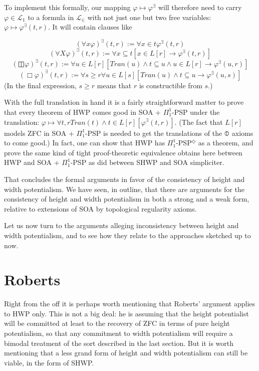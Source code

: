 \documentclass{article}
\begin{document}
To implement this formally, 
our mapping $\varphi \mapsto \varphi^\exists$ will therefore 
need to carry $\varphi \in \mathcal{L}_1$ to a formula in $\mathcal{L}_\in$ with 
not just one but two free variables: $\varphi \mapsto \varphi^\exists(t, r)$. It will 
contain clauses like 

\[ (\forall x \varphi)^\exists(t, r) := \forall x \in t \varphi^\exists(t, r) \]
\[ (\forall X \varphi)^\exists(t, r) := \forall x \subseteq t [x \in L[r] \rightarrow \varphi^\exists(t, r)] \]
\[ (\boxbar \varphi)^\exists(t, r) := \forall u \in L[r] [Tran(u) \wedge t \subseteq u \wedge u \in L[r] \rightarrow \varphi^\exists(u, r)]\]
\[ (\Box \varphi)^\exists(t, r) := \forall s \geq r \forall u \in L[s] [Tran(u) \wedge t \subseteq u  \rightarrow \varphi^\exists(u, s)]\]
(In the final expression, $s \geq r$ means that $r$ is constructible from $s$.)

With the full translation in hand 
it is a fairly straightforward matter to prove that every theorem of HWP 
comes good in SOA + $\Pi_1^1$-PSP under the translation: 
$\varphi \mapsto \forall t, r Tran(t) \wedge t \in L[r][ \varphi^\exists(t, r)]$.
(The fact that $L[r]$ models ZFC
in SOA + $\Pi_1^1$-PSP is needed to get the translations of the $\circledbar$ 
axioms to come good.)
In fact, one can show that HWP has $\Pi_1^1$-PSP$^\Diamond$ as a theorem, and 
prove the same kind of tight proof-theoretic equivalence obtains here 
between HWP and SOA + $\Pi_1^1$-PSP as did between SHWP and SOA simpliciter. 

That concludes the formal arguments 
in favor of the consistency of height and width potentialism.
We have seen, in outline, that there are arguments for the consistency of 
height and width potentialism in both a strong and a weak form, relative to 
extensions of SOA by topological regularity axioms.

Let us 
now turn to the arguments alleging inconsistency between height and width 
potentialism, and to see how they relate to the approaches sketched up to now.

\section{Roberts}

Right from the off it is perhaps worth mentioning 
that Roberts' argument applies to HWP only. This is not a big deal: 
he is assuming that the height potentialist will be committed at least 
to the recovery of ZFC in terms of pure height potentialism, so that 
any commitment to width potentialism will require a bimodal treatment 
of the sort described in the last section. But it is worth mentioning 
that a less grand form of height and width potentialism can still be viable,
in the form of SHWP.
\end{document}
